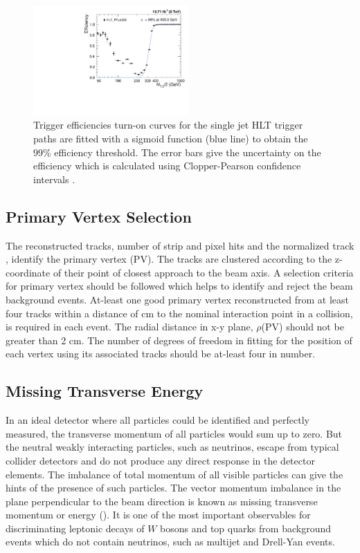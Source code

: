 \begin{figure}[!htbp]
\begin{center}
  \vspace*{6mm}
 \includegraphics[width=0.53\textwidth]{Plots_HT_2_150/Fit_Turn_Efficiency_320_2_ht_2.pdf}
 \caption[Trigger efficiencies turn-on curves for the single jet HLT trigger paths.]{Trigger efficiencies turn-on curves for the single jet HLT trigger paths are fitted with a sigmoid function (blue line) to obtain the 99\% efficiency threshold. The error bars give the uncertainty on the efficiency which is calculated using Clopper-Pearson confidence intervals \cite{10.2307/2331986}.}
 \label{fig:trig_eff}
 \end{center}
\end{figure}

\subsection{Primary Vertex Selection}
The reconstructed tracks, number of strip and pixel hits and the normalized track \chisq, identify the primary vertex (PV). The tracks are clustered according to the z-coordinate of their point of closest approach to the beam axis. A selection criteria for primary vertex should be followed which helps to identify and reject the beam background events. At-least one good primary vertex reconstructed from at least four tracks within a distance of  cm to the nominal interaction point in a collision, is required in each event. The radial distance in x-y plane, $\rho$(PV) should not be greater than 2 cm. The number of degrees of freedom in fitting for the position of each vertex using its associated tracks should be at-least four in number. 

\subsection{Missing Transverse Energy}
In an ideal detector where all particles could be identified and perfectly measured, the transverse momentum of all particles would sum up to zero. But the neutral weakly interacting particles, such as neutrinos, escape from typical collider detectors and do not produce any direct response in the detector elements. The imbalance of total momentum of all visible particles can give the hints of the presence of such particles. The vector momentum imbalance in the plane perpendicular to the beam direction is known as missing transverse momentum or energy (\ETmiss). It is one of the most important observables for discriminating leptonic decays of $W$ bosons and top quarks from background events which do not contain neutrinos, such as multijet and Drell-Yan events.%

